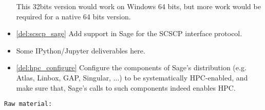 \begin{Workpackage}{\thewpno}
\begin{WPDeliverables}
\begin{itemize}
  This 32bits version would work on Windows 64 bits, but more work
  would be required for a native 64 bits version.
\item \ref{del:scscp_sage} Add support in Sage for the SCSCP interface
  protocol.
\item Some IPython/Jupyter deliverables here.
\item \ref{del:hpc_configure} Configure the components of Sage's
  distribution (e.g. Atlas, Linbox, GAP, Singular, ...) to be
  systematically HPC-enabled, and make sure that, Sage's calls to such
  components indeed enables HPC.
\end{itemize}
\end{WPDeliverables}
\begin{verbatim}
Raw material:


\end{verbatim}
\end{Workpackage}
